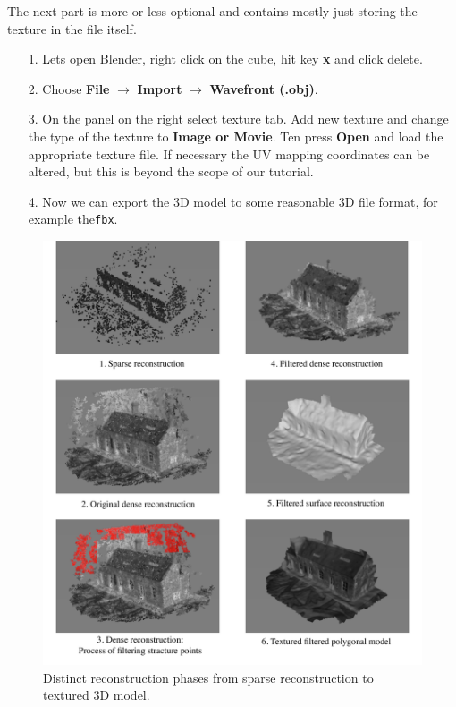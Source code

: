The next part is more or less optional and contains mostly just storing the texture in the file itself.
\begin{itemize}
	\item[1.] Lets open Blender, right click on the cube, hit key \textbf{x} and click delete.
	\item[2.] Choose \textbf{File} $\rightarrow$ \textbf{Import} $\rightarrow$ \textbf{Wavefront (.obj)}.
	\item[3.] On the panel on the right select texture tab. Add new texture and change the type of the texture to \textbf{Image or Movie}. Ten press \textbf{Open} and load the appropriate texture file. If necessary the UV mapping coordinates can be altered, but this is beyond the scope of our tutorial.
	\item[4.] Now we can export the 3D model to some reasonable 3D file format, for example the\texttt{fbx}.
\end{itemize} 


\begin{figure}[ht]
	\begin{center}
		\includegraphics[keepaspectratio,width=\textwidth]{fig/reconstruction-overview.pdf}
	\end{center}
	\caption{Distinct reconstruction phases from sparse reconstruction to textured 3D model.}
	\label{fig:reconstruction-overview}
\end{figure}

